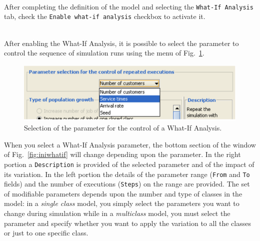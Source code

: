 \\ After
completing the definition of the model and selecting the
\texttt{What-If Analysis} tab, check the \texttt{Enable what-if
analysis} checkbox to activate it.

\\ After enabling
the What-If Analysis, it is possible to select the parameter to
control the sequence of simulation runs using the menu of
Fig.~\ref{fig:selparwhatif}.
\begin{figure}[hbt]
    \begin{center}
        \includegraphics[scale=.5]{img/jsimg/7.2.eps}
    \end{center}
    \caption{Selection of the parameter for the control
    of a What-If Analysis.}
    \label{fig:selparwhatif}
\end{figure}
When you select a What-If Analysis parameter, the bottom section
of the window of Fig.~\ref{fig:iniwhatif} will change depending
upon the parameter. In the right portion a \texttt{Description} is
provided of the selected parameter and of the impact of its
variation. In the left portion the details of the parameter range
(\texttt{From} and \texttt{To} fields) and the number of
executions (\texttt{Steps}) on the range are provided. The set of
modifiable parameters depends upon the number and type of classes
in the model: in a \emph{single class} model, you simply select
the parameters you want to change during simulation while in a
\emph{multiclass} model, you must select the parameter and specify
whether you want to apply the variation to all the classes or just
to one specific class.\\

